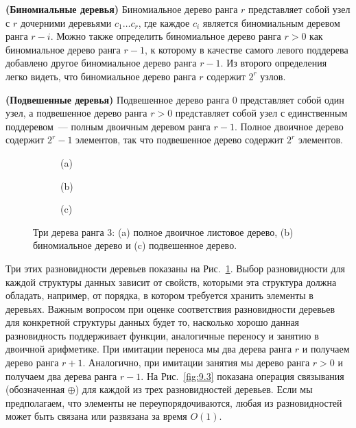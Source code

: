 \begin{definition}
  \textbf{(Биномиальные деревья)} Биномиальное дерево ранга $r$
  представляет собой узел с $r$ дочерними деревьями $c_1 \ldots c_r$,
  где каждое $c_i$ является биномиальным деревом ранга $r -
  i$. Можно также определить биномиальное дерево ранга $r > 0$ как
  биномиальное дерево ранга $r - 1$, к которому в качестве самого
  левого поддерева добавлено другое биномиальное дерево ранга $r -
  1$. Из второго определения легко видеть, что биномиальное дерево
  ранга $r$ содержит $2^r$ узлов.
\end{definition}

\begin{definition}
  \textbf{(Подвешенные деревья)} Подвешенное дерево ранга 0 представляет собой один узел, а
  подвешенное дерево ранга $r > 0$ представляет собой узел с единственным
  поддеревом~--- полным двоичным деревом ранга $r - 1$. Полное
  двоичное дерево содержит $2^r - 1$ элементов, так что подвешенное дерево
  содержит $2^r$ элементов.
\end{definition}

\begin{figure}
  \begin{subfigure}[b]{0.3\textwidth}
    \centering
    \par\vspace{0.2cm}
    (a)
  \end{subfigure}
  \begin{subfigure}[b]{0.3\textwidth}
    \centering
    \par\vspace{0.2cm}
    (b)
  \end{subfigure}
  \begin{subfigure}[b]{0.3\textwidth}
    \centering
    \par\vspace{0.2cm}
    (c)
  \end{subfigure}
  \caption{Три дерева ранга 3: (a) полное двоичное листовое дерево,
    (b) биномиальное дерево и (c) подвешенное дерево.}
  \label{fig:9.2}
\end{figure}

Три этих разновидности деревьев показаны на
Рис.~\ref{fig:9.2}. Выбор разновидности для каждой структуры данных
зависит от свойств, которыми эта структура должна обладать, например,
от порядка, в котором требуется хранить элементы в деревьях. Важным
вопросом при оценке соответствия разновидности деревьев для конкретной
структуры данных будет то, насколько хорошо данная разновидность
поддерживает функции, аналогичные переносу и занятию в двоичной
арифметике. При имитации переноса мы  два дерева
ранга $r$ и получаем дерево ранга $r+1$. Аналогично, при имитации
занятия мы  дерево ранга $r > 0$ и получаем
два дерева ранга $r-1$. На Рис.~\ref{fig:9.3} показана операция
связывания (обозначенная $\oplus$) 
для каждой из трех разновидностей деревьев. Если мы предполагаем, что
элементы не переупорядочиваются, любая из разновидностей может быть
связана или развязана за время $O(1)$.

